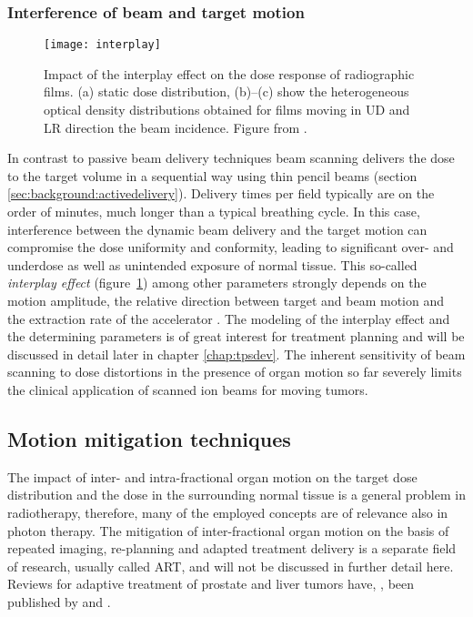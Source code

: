 \subsubsection{Interference of beam and target motion}
\begin{figure}[tbp]
  \centering
  \texttt{[image: interplay]}
  \caption[Impact of the interplay effect on the dose response of
  moving radiographic films.]{ Impact of the interplay effect on the
    dose response of radiographic films. (a) static dose distribution,
    (b)--(c) show the heterogeneous optical density distributions
    obtained for films moving in \acl{UD} and \acl{LR} direction \wrt
    the beam incidence. Figure from \citet{Bert2008}.}
  \label{fig:background:interplay}
\end{figure}
In contrast to passive beam delivery techniques beam scanning delivers
the dose to the target volume in a sequential way using thin pencil
beams (section \ref{sec:background:activedelivery}). Delivery times
per field typically are on the order of minutes, \ie much longer than
a typical breathing cycle. In this case, interference between the
dynamic beam delivery and the target motion can compromise the dose
uniformity and conformity, leading to significant over- and underdose
\citep{Phillips1992} as well as unintended exposure of normal
tissue. This so-called \emph{interplay effect}
(figure~\ref{fig:background:interplay}) among other parameters
strongly depends on the motion amplitude, the relative direction
between target and beam motion and the extraction rate of the
accelerator \citep{Lambert2005,Groezinger2006,Bert2008}. The modeling
of the interplay effect and the determining parameters is of great
interest for treatment planning and will be discussed in detail later
in chapter \ref{chap:tpsdev}. The inherent sensitivity of beam
scanning to dose distortions in the presence of organ motion so far
severely limits the clinical application of scanned ion beams for
moving tumors.

\subsection{Motion mitigation techniques}
\label{sec:background:mitigation}
The impact of inter- and intra-fractional organ motion on the target
dose distribution and the dose in the surrounding normal tissue is a
general problem in radiotherapy, therefore, many of the employed
concepts are of relevance also in photon therapy. The mitigation of
inter-fractional organ motion on the basis of repeated imaging,
re-planning and adapted treatment delivery is a separate field of
research, usually called \ac{ART}, and will not be discussed in
further detail here. Reviews for adaptive treatment of prostate and
liver tumors have, \eg, been published by \citet{Ghilezan2010} and
\citet{Brock2010a}.

